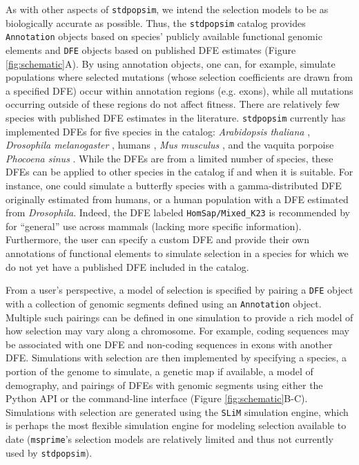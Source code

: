 \documentclass[hidelinks]{article}
\newcommand{\stdpopsim}{\texttt{stdpopsim}\xspace}
\newcommand{\slim}{\texttt{SLiM}\xspace}
\newcommand{\msprime}{\texttt{msprime}\xspace}
\begin{document}
    As with other aspects of \stdpopsim, we intend the selection models to be as biologically accurate as possible.
    Thus, the \stdpopsim catalog provides \texttt{Annotation} objects based on species' publicly available functional genomic elements
    and \texttt{DFE} objects based on published DFE estimates (Figure \ref{fig:schematic}A).
    By using annotation objects, one can, for example, simulate populations where selected mutations (whose selection
    coefficients are drawn from a specified DFE) occur within annotation regions (e.g. exons), while all mutations
    occurring outside of these regions do not affect fitness.
    There are relatively few species with published DFE estimates in the literature.
    \stdpopsim currently has implemented DFEs for five species in the catalog:
    \textit{Arabidopsis thaliana} \citep{huber2018gene},
    \textit{Drosophila melanogaster} \citep{ragsdale2016triallelic,huber2017determining,zhen2021greater},
    humans \citep{huber2017determining,kim2017inference,kyriazis2023using,castellano2019compmarison,castellano2019compmarison,rodrigues2024shared},
    \textit{Mus musculus} \citep{booker2021selective},
    and the vaquita porpoise \textit{Phocoena sinus} \citep{robinson2022critically}.
    While the DFEs are from a limited number of species, these DFEs can be applied to other species
    in the catalog if and when it is suitable.
    For instance, one could simulate a butterfly species with a gamma-distributed DFE originally
    estimated from humans, or a human population with a DFE estimated from \textit{Drosophila}.
    Indeed, the DFE labeled \texttt{HomSap/Mixed\_K23} is recommended by \citet{kyriazis2023using}
    for ``general'' use across mammals (lacking more specific information).
    Furthermore, the user can specify a custom DFE and provide their own annotations
    of functional elements to simulate selection in a species for which we do not yet have
    a published DFE included in the catalog.

    From a user's perspective, a model of selection is specified by pairing a \texttt{DFE} object
    with a collection of genomic segments defined using an \texttt{Annotation} object.
    Multiple such pairings can be defined in one simulation
    to provide a rich model of how selection may vary along a chromosome.
    For example, coding sequences may be associated with one DFE and non-coding sequences in exons with another DFE.
    Simulations with selection are then implemented by specifying a species,
    a portion of the genome to simulate,
    a genetic map if available, a model of demography, and pairings of DFEs with genomic segments
    using either the Python API or the command-line interface (Figure \ref{fig:schematic}B-C).
    Simulations with selection are generated
    using the \slim simulation engine, which is perhaps
    the most flexible simulation engine for modeling selection available to date
    (\msprime's selection models are relatively limited and thus not currently used by \stdpopsim).
\end{document}
